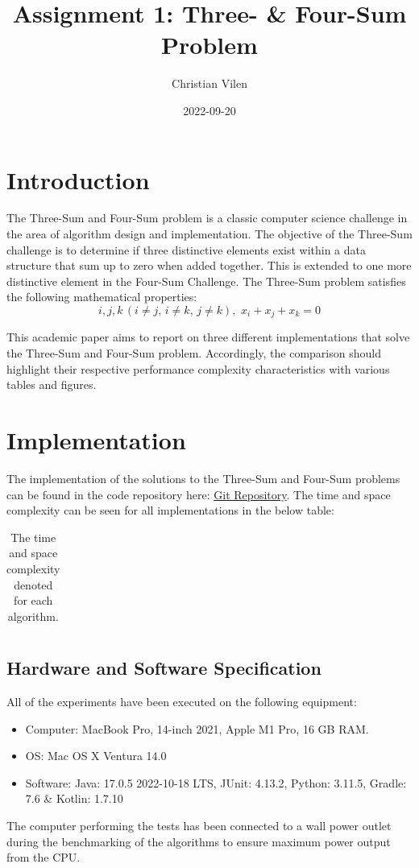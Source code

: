 \documentclass[12pt, a4paper]{article}
\title{Assignment 1: Three- \& Four-Sum Problem}
\author{Christian Vilen}
\date{2022-09-20}
\begin{document}
\maketitle

\section{Introduction}
The Three-Sum and Four-Sum problem is a classic computer science challenge in the area of algorithm design and implementation. The objective of the Three-Sum challenge is to determine if three distinctive elements exist within a data structure that sum up to zero when added together. This is extended to one more distinctive element in the Four-Sum Challenge. The Three-Sum problem satisfies the following mathematical properties:
\[i, j, k \, (i \neq j, \, i \neq k, \, j \neq k), \, \, x_i + x_j + x_k = 0\]

This academic paper aims to report on three different implementations that solve the Three-Sum and Four-Sum problem. Accordingly, the comparison should highlight their respective performance complexity characteristics with various tables and figures.

\section{Implementation}

The implementation of the solutions to the Three-Sum and Four-Sum problems can be found in the code repository here: \href{https://github.com/C-Vilen/ITU_Applied_Algo_2023/tree/main/ThreeFourSum}{Git Repository}.
The time and space complexity can be seen for all implementations in the below table:
\begin{table}[H]
  \begin{center}
    \begin{adjustbox}{max width=0.7\textwidth}
      \begin{tabular}{|c|c|c|c|}
        
      \end{tabular}
    \end{adjustbox}
    \caption{The time and space complexity denoted for each algorithm.}
    \label{tbl:threeFourSumComplexityTable}
  \end{center}
\end{table}


\subsection{Hardware and Software Specification}
All of the experiments have been executed on the following equipment:
\begin{itemize}
\item Computer: MacBook Pro, 14-inch 2021, Apple M1 Pro, 16 GB RAM.
\item OS: Mac OS X Ventura 14.0
\item Software: Java: 17.0.5 2022-10-18 LTS, JUnit: 4.13.2, Python: 3.11.5, Gradle: 7.6 \& Kotlin: 1.7.10
\end{itemize}
The computer performing the tests has been connected to a wall power outlet during the benchmarking of the algorithms to ensure maximum power output from the CPU.
\end{document}
